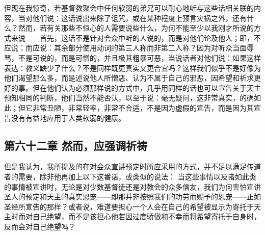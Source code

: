 但现在我惊奇，若基督教聚会中任何软弱的弟兄可以耐心地听与这些话相关联的内容，当对他们说：这话说出来除了诅咒，或在某种程度上预言灾祸之外，还有什么？然而，若有关那些不恒心的人需要说些什么，为何不能至少以我刚才所说的方式来说——首先，这话不是针对会众中听的人说的，而是对他们论及他人；即，不应说：而应说：其余部分使用动词的第三人称而非第二人称？因为对听众当面辱骂，不是可说的，而是可憎的，并且极其粗暴可恶，当说话者对他们说：如果这样表达：教义缺少了什么？不是同样既更真实又更合宜吗？这样我们似乎不是好像为他们渴望那么多，而是述说他人所憎恶、认为不属于自己的邪恶，因希望和祈求更好的事。但在他们认为必须那样说的方式中，几乎用同样的话也可以宣告关于天主预知相同的判断，他们当然不能否认，以至于说：毫无疑问，这非常真实，的确如此；但它非常丑陋，非常轻率，非常不合适，不是因为虚假的宣告，而是因为其宣告没有有益地应用于人类软弱的健康。\par


\subsection{第六十二章 然而，应强调祈祷}

但是我认为，我所提及的在对会众宣讲预定时所应采用的方式，并不足以满足传道者的需要，除非他再加上以下这番话，或类似的说法：  当这些事情以及诸如此类的事情被宣讲时，无论是对少数基督徒还是对教会的众多信友，我们为何害怕宣讲圣人的预定和天主的真实恩宠——即那并非按照我们的功劳而赐予的恩宠——正如圣经所宣告的那样？或者说，难道要担心一个人会在自己的希望被显示为寄托于天主时而对自己绝望，而不是该担心他若因过度骄傲和不幸而将希望寄托于自身时，反而会对自己绝望吗？\par

